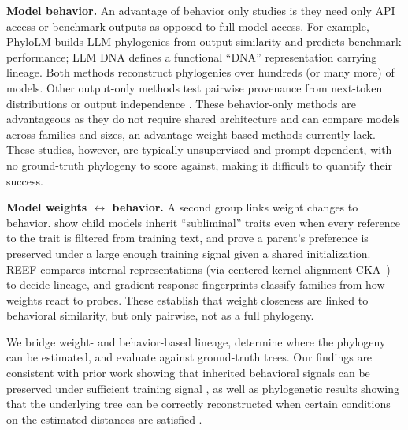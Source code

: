 \documentclass{article}
\theoremstyle{definition}
\theoremstyle{plain}
\begin{document}
\textbf{Model behavior.} An advantage of behavior only studies is they need only API access or benchmark outputs
\citep{yax2025phylolm, wu2026llmdna} as opposed to full model access. For example, PhyloLM \citep{yax2025phylolm} builds LLM phylogenies from output
similarity and predicts benchmark performance; LLM DNA \citep{wu2026llmdna} defines a functional
``DNA'' representation carrying lineage. Both methods reconstruct phylogenies over hundreds (or many more) of models. Other
output-only methods test pairwise provenance from next-token distributions \citep{nikolic2026model} or
output independence \citep{zhu2025independence}. These behavior-only methods are advantageous as they do not require shared
architecture and can compare models across families and sizes, an advantage weight-based methods currently lack.
These studies, however, are typically unsupervised and prompt-dependent, with no ground-truth phylogeny to score
against, making it difficult to quantify their success.

\textbf{Model weights $\leftrightarrow$ behavior.} A second group links weight changes to
behavior. \citet{cloud2025subliminal} show child models inherit ``subliminal'' traits even when every
reference to the trait is filtered from training text, and prove a parent's preference is preserved
under a large enough training signal given a shared initialization. REEF \citep{zhang2025reef} compares
internal representations (via centered kernel alignment CKA~\citep{kornblith2019similarity}) to decide lineage, and gradient-response fingerprints
\citep{tensorguard2025} classify families from how weights react to probes. These establish that
weight closeness are linked to behavioral similarity, but only pairwise, not as a full phylogeny.

We bridge weight- and behavior-based lineage, determine where the phylogeny can be estimated, and evaluate against ground-truth trees. Our findings are consistent with prior work showing that inherited behavioral signals can be preserved under sufficient training signal \citep{cloud2025subliminal}, as well as phylogenetic results showing that the underlying tree can be correctly reconstructed when certain conditions on the estimated distances are satisfied \citep{atteson1999performance}.
\end{document}

